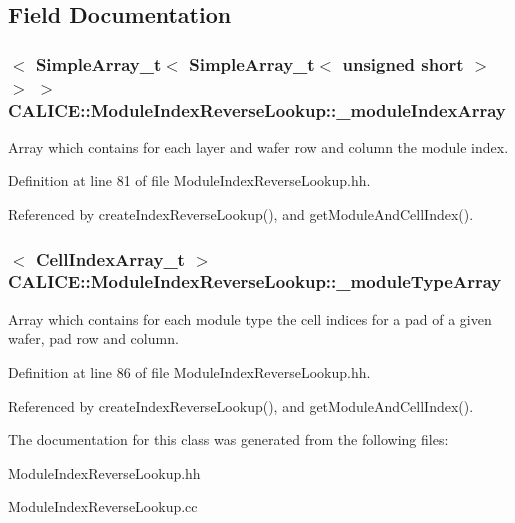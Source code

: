 \subsection{Field Documentation}
\subsubsection[{\_\-moduleIndexArray}]{$<$ {\bf SimpleArray\_\-t}$<$ {\bf SimpleArray\_\-t}$<$ unsigned short $>$ $>$ $>$ {\bf CALICE::ModuleIndexReverseLookup::\_\-moduleIndexArray}\hspace{0.3cm}{\ttfamily  [protected]}}\label{classCALICE_1_1ModuleIndexReverseLookup_a6f4c66de3a572faa169b6d8f605e7e2f}


Array which contains for each layer and wafer row and column the module index. 

Definition at line 81 of file ModuleIndexReverseLookup.hh.

Referenced by createIndexReverseLookup(), and getModuleAndCellIndex().
\subsubsection[{\_\-moduleTypeArray}]{$<$ {\bf CellIndexArray\_\-t} $>$ {\bf CALICE::ModuleIndexReverseLookup::\_\-moduleTypeArray}\hspace{0.3cm}{\ttfamily  [protected]}}\label{classCALICE_1_1ModuleIndexReverseLookup_a26cc1c3d8dba383ba59b4a8e8b96c98d}


Array which contains for each module type the cell indices for a pad of a given wafer, pad row and column. 

Definition at line 86 of file ModuleIndexReverseLookup.hh.

Referenced by createIndexReverseLookup(), and getModuleAndCellIndex().

The documentation for this class was generated from the following files:\begin{DoxyCompactItemize}
\item 
ModuleIndexReverseLookup.hh\item 
ModuleIndexReverseLookup.cc\end{DoxyCompactItemize}
